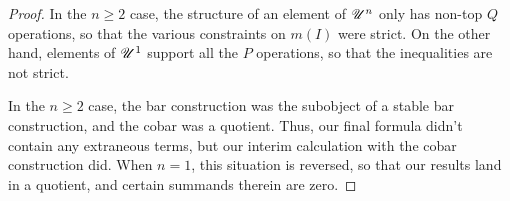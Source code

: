 \documentclass[11pt]{article}
\makeatletter
\newcommand{\nontop}[1]{\scrU^{#1}}%
\newcommand{\produces}[3]{{#1}{#3}{#2}}
\renewcommand{\Q}{Q}
\newcommand{\minDim}{m}
\newcommand{\minDimP}{\overline{m}}
\renewcommand{\produces}[3]{
{
\def\labelstyle{\scriptstyle}
\xymatrix@C=2em@1{
{#1}
\ar@{-}[r]|-{{\,#3\,}}
&%
{#2}%
}}}
\makeatother
\begin{document}
\begin{KoszulComplexes1}
\begin{proof}
In the $n\geq2$ case, the structure of an element of $\nontop{n}$ only has non-top $\Q$ operations, so that the various constraints on $\minDim(I)$ were strict. On the other hand, elements of $\nontop{1}$ support all the $P$ operations, so that the inequalities are not strict.

In the $n\geq2$ case, the bar construction was the subobject of a stable bar construction, and the cobar was a quotient. Thus, our final formula didn't contain any extraneous terms, but our interim calculation with the cobar construction did. When $n=1$, this situation is reversed, so that our results land in a quotient, and certain summands therein are zero.
%
\end{proof}
\end{KoszulComplexes1}
\end{document}
